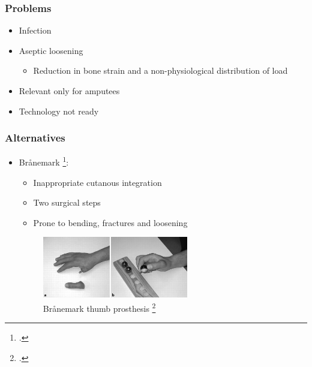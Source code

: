 \begin{frame}
    \frametitle{Problems}

    \begin{itemize}
        \item Infection
        \item Aseptic loosening \begin{itemize}
            \item Reduction in bone strain and a non-physiological distribution of load
        \end{itemize}
        \item Relevant only for amputees
        \item Technology not ready
    \end{itemize}

\end{frame}

\begin{frame}
    \frametitle{Alternatives}

    \begin{itemize}
        \item Brånemark \footcite{KANG20101130}: \begin{itemize}
            \item Inappropriate cutanous integration
            \item Two surgical steps
            \item Prone to bending, fractures and loosening
        \end{itemize}
        \begin{figure}[h]
        \centering
            \includegraphics[width=0.6\textwidth]{figures/branemark-thumb.png}
        \caption{{ Brånemark thumb prosthesis \footcite{Li2017Branemark} }}
        \end{figure}
    \end{itemize}

\end{frame}
